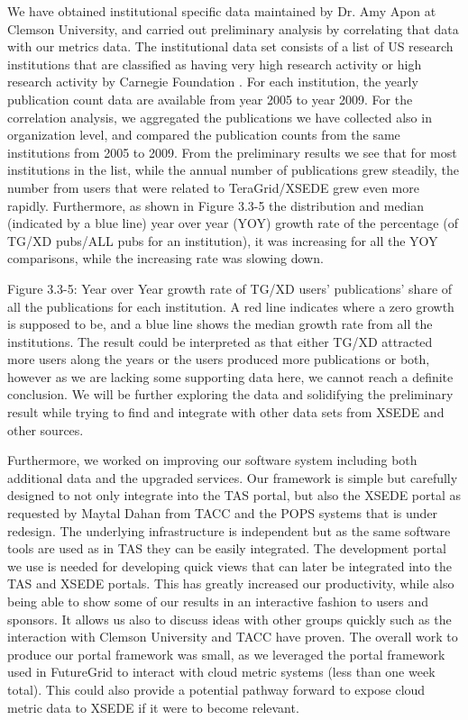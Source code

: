 We have obtained institutional specific data maintained by Dr. Amy
Apon at Clemson University, and carried out preliminary analysis by
correlating that data with our metrics data. The institutional data
set consists of a list of US research institutions that are classified
as having very high research activity or high research activity by
Carnegie Foundation \cite{carnegiefoundation-decription}. For each institution, the yearly publication count data are available from year 2005 to year 2009. For the correlation analysis, we aggregated the publications we have collected also in organization level, and compared the publication counts from the same institutions from 2005 to 2009. From the preliminary results we see that for most institutions in the list, while the annual number of publications grew steadily, the number from users that were related to TeraGrid/XSEDE grew even more rapidly. Furthermore, as shown in Figure 3.3-5 the distribution and median (indicated by a blue line) year over year (YOY) growth rate of the percentage (of TG/XD pubs/ALL pubs for an institution), it was increasing for all the YOY comparisons, while the increasing rate was slowing down.

 
Figure 3.3-5: Year over Year growth rate of TG/XD users’ publications’ share of all the publications for each institution. A red line indicates where a zero growth is supposed to be, and a blue line shows the median growth rate from all the institutions.
The result could be interpreted as that either TG/XD attracted more users along the years or the users produced more publications or both, however as we are lacking some supporting data here, we cannot reach a definite conclusion. We will be further exploring the data and solidifying the preliminary result while trying to find and integrate with other data sets from XSEDE and other sources.

Furthermore, we worked on improving our software system including both additional data and the upgraded services. Our framework is simple but carefully designed to not only integrate into the TAS portal, but also the XSEDE portal as requested by Maytal Dahan from TACC and the POPS systems that is under redesign. The underlying infrastructure is independent but as the same software tools are used as in TAS they can be easily integrated. The development portal we use is needed for developing quick views that can later be integrated into the TAS and XSEDE portals. This has greatly increased our productivity, while also being able to show some of our results in an interactive fashion to users and sponsors. It allows us also to discuss ideas with other groups quickly such as the interaction with Clemson University and TACC have proven. The overall work to produce our portal framework was small, as we leveraged the portal framework used in FutureGrid to interact with cloud metric systems (less than one week total). This could also provide a potential pathway forward to expose cloud metric data to XSEDE if it were to become relevant.

